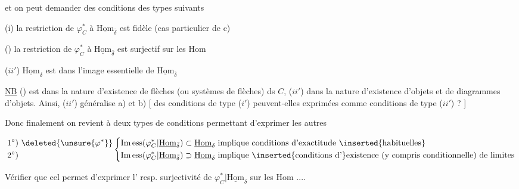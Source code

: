 
et on peut demander des conditions des types suivants

(i) la restriction de $\varphi^*_C$ à $\underline{\mathrm{Hom}}_{\bar\delta}$ est fidèle (cas particulier de c)

() la restriction de $\varphi^*_C$ à $\underline{\mathrm{Hom}}_{\bar\delta}$ est  surjectif sur les Hom


($ii'$) $\underline{\mathrm{Hom}}_\delta$ est dans l'image essentielle de $\underline{\mathrm{Hom}}_{\bar\delta}$

\uline{NB} ()  est dans la nature  d'existence de flèches (ou systèmes de flèches) ds $C$,  ($ii'$) dans la nature d'existence d'objets et de diagrammes d'objets. Ainsi, ($ii'$) généralise a) et b) [  des conditions de type ($i'$) peuvent-elles  exprimées comme conditions de type ($ii'$) ? ]


Donc finalement on revient à deux types de conditions permettant d'exprimer les autres

\[
\begin{aligned}1^\circ)&\ \deleted{\unsure{\varphi^*}}\\2^\circ)&\end{aligned}
\left\{\begin{aligned}
&\mathrm{Im\,ess}(\varphi^*_C\vert\underline{\mathrm{Hom}}_{\bar\delta})\subset\underline{\mathrm{Hom}}_\delta\\
&\mathrm{Im\,ess}(\varphi^*_C\vert\underline{\mathrm{Hom}}_{\bar\delta})\supset\underline{\mathrm{Hom}}_\delta
\end{aligned}\right.
\begin{aligned}
&\text{implique conditions d'exactitude }\inserted{\text{habituelles}}\\
&\text{implique }\inserted{\text{conditions d'}}\text{existence (y compris conditionnelle) de limites}
\end{aligned}
\]

Vérifier que cel permet  d'exprimer l' resp. surjectivité de $\varphi^*_C\vert\underline{\mathrm{Hom}}_\delta$ sur les Hom ....

